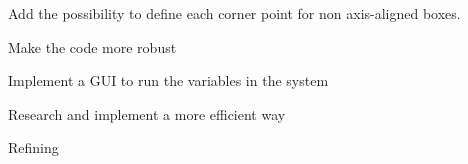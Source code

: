 
\begin{DoxyRefList}
\item[\label{todo__todo000001}%
\hypertarget{todo__todo000001}{}%
File \hyperlink{BoundingBox_8h}{Bounding\+Box.h} ]Add the possibility to define each corner point for non axis-\/aligned boxes.  
\item[\label{todo__todo000002}%
\hypertarget{todo__todo000002}{}%
File \hyperlink{FluidSolver_8h}{Fluid\+Solver.h} ]Make the code more robust  
\item[\label{todo__todo000003}%
\hypertarget{todo__todo000003}{}%
File \hyperlink{FluidSystem_8h}{Fluid\+System.h} ]Implement a G\+UI to run the variables in the system  
\item[\label{todo__todo000004}%
\hypertarget{todo__todo000004}{}%
File \hyperlink{NNS_8h}{N\+NS.h} ]Research and implement a more efficient way  
\item[\label{todo__todo000005}%
\hypertarget{todo__todo000005}{}%
File \hyperlink{Particle_8h}{Particle.h} ]Refining 
\end{DoxyRefList}